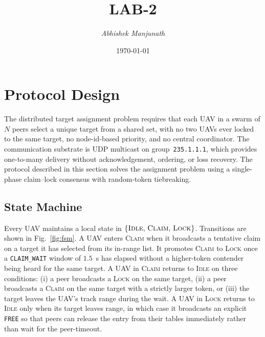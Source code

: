 \documentclass[11pt,letterpaper]{article}
\title{LAB-2}
\author{\textit{Abhishek Manjunath}}
\date{\today}
\begin{document}
\maketitle

\section{Protocol Design}

The distributed target assignment problem requires that each UAV in a
swarm of $N$ peers select a unique target from a shared set, with no
two UAVs ever locked to the same target, no node-id-based priority, and
no central coordinator. The communication substrate is UDP multicast on
group~\texttt{235.1.1.1}, which provides one-to-many delivery without
acknowledgement, ordering, or loss recovery. The protocol described in
this section solves the assignment problem using a single-phase
claim--lock consensus with random-token tiebreaking.

\subsection{State Machine}
\label{sec:fsm}

Every UAV maintains a local state in
$\{\textsc{Idle},\,\textsc{Claim},\,\textsc{Lock}\}$. Transitions are
shown in Fig.~\ref{fig:fsm}. A UAV enters \textsc{Claim} when it
broadcasts a tentative claim on a target it has selected from its
in-range list. It promotes \textsc{Claim} to \textsc{Lock} once a
\texttt{CLAIM\_WAIT} window of $1.5$~s has elapsed without a higher-token
contender being heard for the same target. A UAV in \textsc{Claim}
returns to \textsc{Idle} on three conditions: (i) a peer broadcasts a
\textsc{Lock} on the same target, (ii) a peer broadcasts a \textsc{Claim}
on the same target with a strictly larger token, or (iii) the target
leaves the UAV's track range during the wait. A UAV in \textsc{Lock}
returns to \textsc{Idle} only when its target leaves range, in which
case it broadcasts an explicit \texttt{FREE} so that peers can release
the entry from their tables immediately rather than wait for the
peer-timeout.
\end{document}
